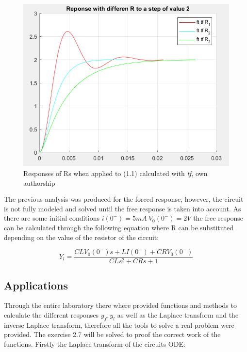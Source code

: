 \documentclass[a4paper,12pt]{article}
\begin{document}
\begin{figure}[H]
    \centering
    \includegraphics[width=0.5\linewidth]{fonts_lab_1/response_diff_r.png}
    \caption{Responses of Rs when applied to (1.1) calculated with \textit{tf}, own authorship}
    \label{fig:response-diff-r}
\end{figure}

\vspace{0.5cm}

The previous analysis was produced for the forced response, however, the circuit is not fully modeled and solved until the free response is taken into account. As there are some initial conditions \(i(0^-) = 5mA \ V_0(0^-) = 2V\) the free response can be calculated through the following equation where R can be substituted depending on the value of the resistor of the circuit:

\vspace{0.5cm}

\begin{equation}
    Y_l = \frac{CLV_0(0^-)s + LI(0^-) + CRV_0(0^-)}{CLs^2 + CRs + 1}
\end{equation}

\vspace{0.5cm}

\subsection{Applications}

\vspace{0.5cm}

Through the entire laboratory there where provided functions and methods to calculate the different responses \(y_f, y_l\) as well as the Laplace transform and the inverse Laplace transform, therefore all the tools to solve a real problem were provided. The exercise 2.7 will be solved to proof the correct work of the functions. Firstly the Laplace transform of the circuits ODE:

\vspace{0.5cm}
\end{document}
